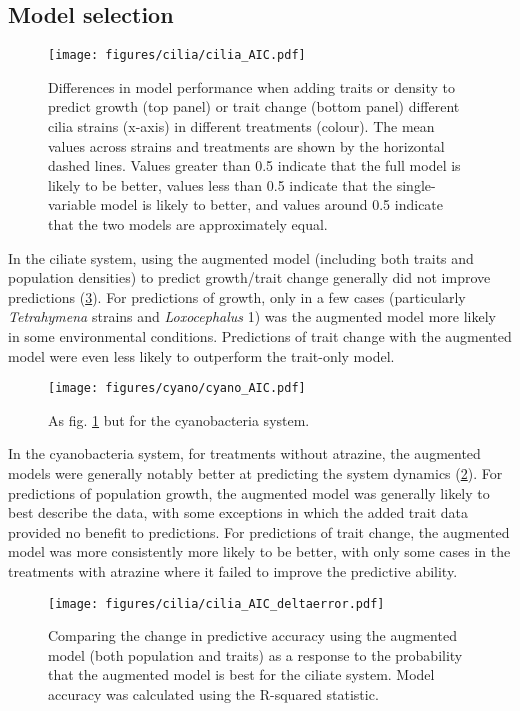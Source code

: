 \documentclass{article}
\begin{document}
\subsection{Model selection}

\begin{figure}[H]
    \centering
    \texttt{[image: figures/cilia/cilia\_AIC.pdf]}
    \caption{Differences in model performance when adding traits or density to predict growth (top panel) or trait change (bottom panel) different cilia strains (x-axis) in different treatments (colour). The mean values across strains and treatments are shown by the horizontal dashed lines. Values greater than 0.5 indicate that the full model is likely to be better, values less than 0.5 indicate that the single-variable model is likely to better, and values around 0.5 indicate that the two models are approximately equal.}
    \label{fig:cilia_AIC}
\end{figure}

In the ciliate system, using  the augmented model (including both traits and population densities) to predict growth/trait change generally did not improve predictions (\cref{fig:cilia_AIC_deltaerror}). For predictions of growth, only in a few cases (particularly \textit{Tetrahymena} strains and \textit{Loxocephalus} 1) was the augmented model more likely in some environmental conditions. Predictions of trait change with the augmented model were even less likely to outperform the trait-only model.

\begin{figure}[H]
    \centering
    \texttt{[image: figures/cyano/cyano\_AIC.pdf]}
    \caption{As fig. \ref{fig:cilia_AIC} but for the cyanobacteria system.}
  \label{fig:cyano_AIC}
\end{figure}

In the cyanobacteria system, for treatments without atrazine, the augmented models were generally notably better at predicting the system dynamics (\cref{fig:cyano_AIC}). For predictions of population growth, the augmented model was generally likely to best describe the data, with some exceptions in which the added trait data provided no benefit to predictions. For predictions of trait change, the augmented model was more consistently more likely to be better, with only some cases in the treatments with atrazine where it failed to improve the predictive ability.

\begin{figure}[H]
    \centering
    \texttt{[image: figures/cilia/cilia\_AIC\_deltaerror.pdf]}
    \caption{Comparing the change in predictive accuracy using the augmented model (both population and traits) as a response to the probability that the augmented model is best for the ciliate system. Model accuracy was calculated using the R-squared statistic. } 
    \label{fig:cilia_AIC_deltaerror}
\end{figure}
\end{document}
